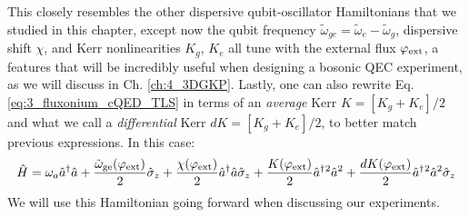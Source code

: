 This closely resembles the other dispersive qubit-oscillator Hamiltonians that we studied in this chapter, except now the qubit frequency $\tilde{\omega}_{ge} = \tilde{\omega}_{e} - \tilde{\omega}_{g}$, dispersive shift $\chi$, and Kerr nonlinearities $K_g$, $K_e$ all tune with the external flux $\varphi_{\rm ext}$, a features that will be incredibly useful when designing a bosonic QEC experiment, as we will discuss in Ch. \ref{ch:4_3DGKP}. Lastly, one can also rewrite Eq. \eqref{eq:3_fluxonium_cQED_TLS} in terms of an \textit{average} Kerr $K = [K_g + K_e]/2$ and what we call a \textit{differential} Kerr $dK = [K_g + K_e]/2$, to better match previous expressions. In this case:
\begin{equation}
    \hat{H} = \omega_a \hat{a}^\dagger\hat{a} + \frac{\tilde{\omega}_{\rm ge}(\varphi_{\rm ext})}{2} \hat{\sigma}_z + \frac{\chi(\varphi_{\rm ext})}{2}\hat{a}^\dagger\hat{a}\hat{\sigma}_z  + \frac{K(\varphi_{\rm ext})}{2}\hat{a}^\dagger{}^2\hat{a}^2 + \frac{dK(\varphi_{\rm ext})}{2}\hat{a}^\dagger{}^2\hat{a}^2\hat{\sigma}_z
\end{equation}
We will use this Hamiltonian going forward when discussing our experiments. 